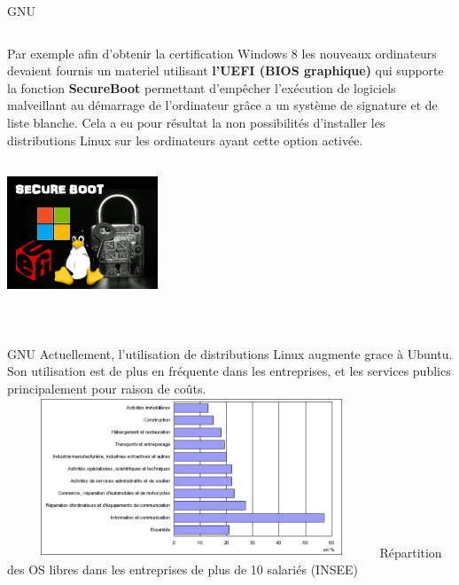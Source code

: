 \begin{frame}[t,fragile]{GNU}
    \fontsize{8}{10.5}\selectfont
        \begin{columns}
 Par exemple afin d’obtenir la certification Windows 8 les nouveaux ordinateurs devaient fournis un materiel utilisant \textbf{l’UEFI (BIOS graphique)} qui supporte la fonction \textbf{SecureBoot} permettant d'empêcher l'exécution de logiciels malveillant au démarrage de l’ordinateur grâce a un système de signature et de liste blanche. Cela a eu pour résultat la non possibilités d’installer les distributions Linux sur les ordinateurs ayant cette option activée.
                \centering
                    \includegraphics[height=5cm, width=4.5cm]{secure-boot}
        \end{columns}
\end{frame}

\begin{frame}[t,fragile]{GNU}
    \fontsize{8}{10.5}\selectfont
Actuellement, l’utilisation de distributions Linux augmente grace à Ubuntu. \linebreak Son utilisation est de plus en fréquente dans les entreprises, et les services publics principalement pour raison de coûts.
    \includegraphics[height=4.75cm, width=11cm]{graphique1}
    \fontsize{8}{9}\selectfont \linebreak Répartition des OS libres dans les entreprises de plus de 10 salariés (INSEE)
\end{frame}


